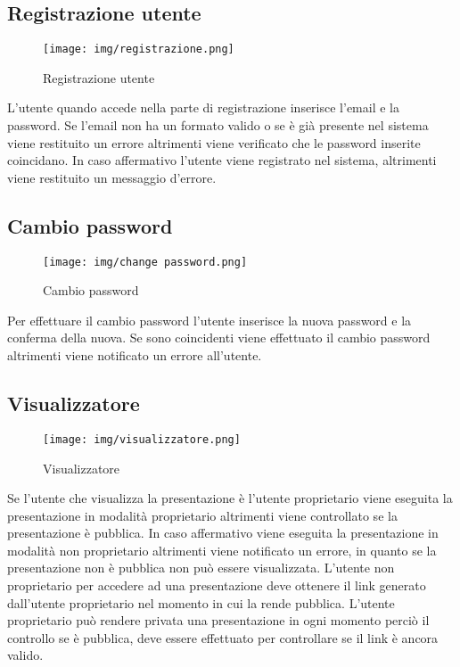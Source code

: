 \subsection{Registrazione utente}

\begin{figure}[h!]
		\centering
		\texttt{[image: img/registrazione.png]}
		\caption{Registrazione utente}
		\label{fig:ModelloSpy}
\end{figure}

L'utente quando accede nella parte di registrazione inserisce l'email e la password. Se l'email non ha un formato valido o se è già presente nel sistema viene restituito un errore altrimenti viene verificato che le password inserite coincidano. In caso affermativo l'utente viene registrato nel sistema, altrimenti viene restituito un messaggio d'errore.

\subsection{Cambio password}

\begin{figure}[h!]
		\centering
		\texttt{[image: img/change password.png]}
		\caption{Cambio password}
		\label{fig:ModelloSpy}
\end{figure}

Per effettuare il cambio password l'utente inserisce la nuova password e la conferma della nuova. Se sono coincidenti viene effettuato il cambio password altrimenti viene notificato un errore all'utente.

\subsection{Visualizzatore}

\begin{figure}[h!]
		\centering
		\texttt{[image: img/visualizzatore.png]}
		\caption{Visualizzatore}
		\label{fig:ModelloSpy}
\end{figure} 

Se l'utente che visualizza la presentazione è l'utente proprietario viene eseguita la presentazione in modalità proprietario altrimenti viene controllato se la presentazione è pubblica. In caso affermativo viene eseguita la presentazione in modalità non proprietario altrimenti viene notificato un errore, in quanto se la presentazione non è pubblica non può essere visualizzata. L'utente non proprietario per accedere ad una presentazione deve ottenere il link generato dall'utente proprietario nel momento in cui la rende pubblica. L'utente proprietario può rendere privata una presentazione in ogni momento perciò il controllo se è pubblica, deve essere effettuato per controllare se il link è ancora valido.

